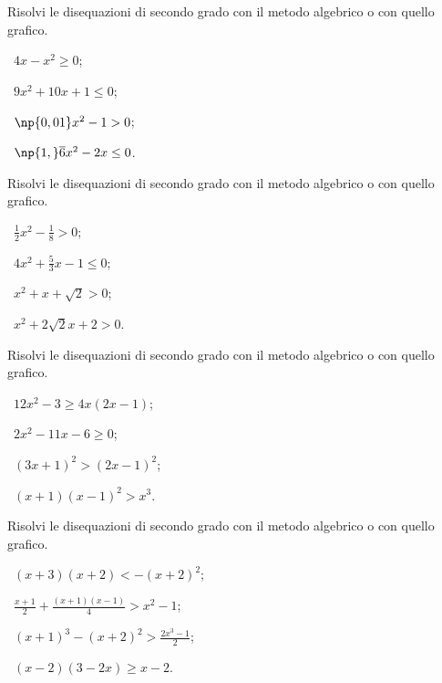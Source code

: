 \begin{esercizio}[\Ast]
 \label{ese:4.15}
Risolvi le disequazioni di secondo grado con il metodo algebrico o con quello grafico.
\begin{multicols}{2}
 \begin{enumeratea}
 \item~$4x-x^2\ge 0$;
 \item~$9x^2+10x+1\le 0$;
 \item~$\np{0,01}x^2-1>0$;
 \item~$\np{1,}\overline{6}x^2-2x\le 0$.
 \end{enumeratea}
 \end{multicols}
\end{esercizio}

\begin{esercizio}[\Ast]
 \label{ese:4.16}
Risolvi le disequazioni di secondo grado con il metodo algebrico o con quello grafico.
\begin{multicols}{2}
 \begin{enumeratea}
 \item~$\frac 1 2x^2-\frac 1 8>0$;
 \item~$4x^2+\frac 5 3x-1\le 0$;
 \item~$x^2+x+\sqrt 2>0$;
 \item~$x^2+2\sqrt 2x+2>0$.
 \end{enumeratea}
 \end{multicols}
\end{esercizio}

\begin{esercizio}[\Ast]
 \label{ese:4.17}
Risolvi le disequazioni di secondo grado con il metodo algebrico o con quello grafico.
\begin{multicols}{2}
 \begin{enumeratea}
 \item~$12x^2-3\ge 4x(2x-1)$;
 \item~$2x^2-11x-6\ge 0$;
 \item~$(3x+1)^2>(2x-1)^2$;
 \item~$(x+1)(x-1)^2>x^3$.
 \end{enumeratea}
 \end{multicols}
\end{esercizio}

\begin{esercizio}[\Ast]
 \label{ese:4.18}
Risolvi le disequazioni di secondo grado con il metodo algebrico o con quello grafico.
\begin{multicols}{2}
 \begin{enumeratea}
 \item~$(x+3)(x+2)<-(x+2)^2$;
 \item~$\frac{x+1} 2+\frac{(x+1)(x-1)} 4>x^2-1$;
 \item~$(x+1)^3-(x+2)^2>\frac{2x^3-1} 2$;
 \item~$(x-2)(3-2x)\ge x-2$.
 \end{enumeratea}
 \end{multicols}
\end{esercizio}

